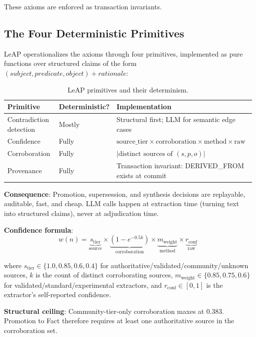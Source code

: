 \documentclass[11pt,letterpaper]{article}
\begin{document}
These axioms are enforced as transaction invariants.

\subsection{The Four Deterministic Primitives}

LeAP operationalizes the axioms through four primitives, implemented as pure functions over structured claims of the form $(subject, predicate, object) + rationale$:

\begin{table}[H]
\centering
\caption{LeAP primitives and their determinism.}
\label{tab:primitives}
\begin{tabular}{@{}lll@{}}
\toprule
\textbf{Primitive} & \textbf{Deterministic?} & \textbf{Implementation} \\
\midrule
Contradiction detection & Mostly & Structural first; LLM for semantic edge cases \\
Confidence & Fully & $\text{source\_tier} \times \text{corroboration} \times \text{method} \times \text{raw}$ \\
Corroboration & Fully & $|\text{distinct sources of } (s, p, o)|$ \\
Provenance & Fully & Transaction invariant: DERIVED\_FROM exists at commit \\
\bottomrule
\end{tabular}
\end{table}

\textbf{Consequence}: Promotion, supersession, and synthesis decisions are replayable, auditable, fast, and cheap. LLM calls happen at extraction time (turning text into structured claims), never at adjudication time.

\textbf{Confidence formula}:
\[
w(n) = \underbrace{s_{\text{tier}}}_{\text{source}} \times \underbrace{(1 - e^{-0.5k})}_{\text{corroboration}} \times \underbrace{m_{\text{weight}}}_{\text{method}} \times \underbrace{r_{\text{conf}}}_{\text{raw}}
\]

where $s_{\text{tier}} \in \{1.0, 0.85, 0.6, 0.4\}$ for authoritative/validated/community/unknown sources, $k$ is the count of distinct corroborating sources, $m_{\text{weight}} \in \{0.85, 0.75, 0.6\}$ for validated/standard/experimental extractors, and $r_{\text{conf}} \in [0,1]$ is the extractor's self-reported confidence.

\textbf{Structural ceiling}: Community-tier-only corroboration maxes at 0.383. Promotion to Fact therefore requires at least one authoritative source in the corroboration set.
\end{document}

